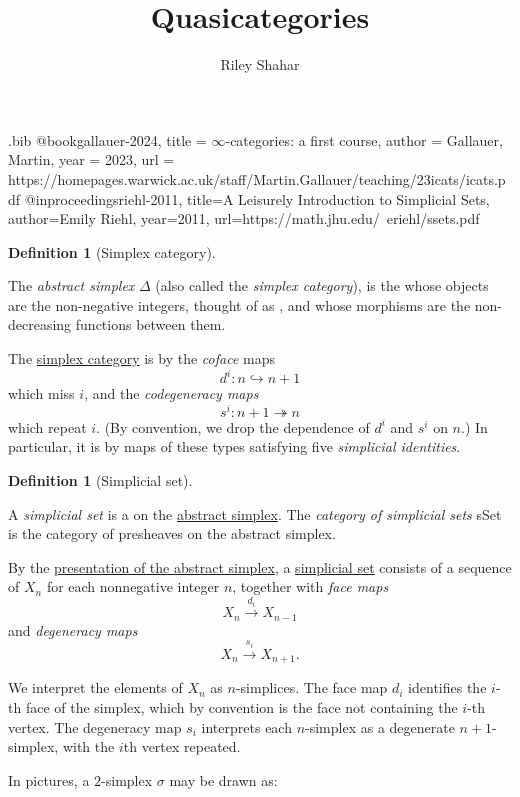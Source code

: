 \documentclass[oneside,a4paper]{book}%
\title{Quasicategories}\author{Riley Shahar}
\theoremstyle{definition}%
\newtheorem{definition}[theorem]{Definition}%
\begin{document}
\begin{filecontents*}[overwrite]{\jobname.bib}
@book{gallauer-2024,
  title = {$\infty$-categories: a first course},
  author = {Gallauer, Martin},
  year = {2023},
  url = {https://homepages.warwick.ac.uk/staff/Martin.Gallauer/teaching/23icats/icats.pdf}
}@inproceedings{riehl-2011,
  title={A Leisurely Introduction to Simplicial Sets},
  author={Emily Riehl},
  year={2011},
  url={https://math.jhu.edu/~eriehl/ssets.pdf}
}
\end{filecontents*}
\frontmatter\maketitle\tableofcontents\mainmatter\begin{Section}\label{rs-0083}\begin{definition}[{Simplex category}]\label{rs-007Z}\par{}The \emph{abstract simplex} \(\Delta \) (also called the \emph{simplex category}),
is the  whose objects are the non-negative integers, thought
of as  , and whose morphisms are the
non-decreasing functions between them.\end{definition}\begin{Proposition}\label{rs-0082}\par{}The \hyperref[rs-007Z]{simplex category} is  by the \emph{coface} maps
\[d^i: n\hookrightarrow  n+1\] which miss \(i\), and the \emph{codegeneracy maps} \[s^i: n+1\twoheadrightarrow  n\] which repeat \(i\). (By convention, we drop the dependence of \(d^i\)
and \(s^i\) on \(n\).) In particular, it is  by maps of these
types satisfying five \emph{simplicial identities}.\end{Proposition}\begin{definition}[{Simplicial set}]\label{rs-0080}\par{}A \emph{simplicial set} is a  on the \hyperref[rs-007Z]{abstract
simplex}. The \emph{category of simplicial sets} sSet is the
category of presheaves on the abstract simplex.\end{definition}\begin{Explanation}\label{rs-0081}\par{}By the \hyperref[rs-0082]{presentation of the abstract simplex}, a \hyperref[rs-0080]{simplicial
set} consists of a sequence of  \(X_n\) for each
nonnegative integer \(n\), together with \emph{face maps} \[X_n\xrightarrow {d_i} X_{n-1}\]
and \emph{degeneracy maps} \[X_n\xrightarrow {s_i} X_{n+1}.\]\par{}We interpret the elements of \(X_n\) as \(n\)-simplices. The face map
\(d_i\) identifies the \(i\)-th face of the simplex, which by convention is the
face not containing the \(i\)-th vertex. The degeneracy map \(s_i\) interprets
each \(n\)-simplex as a degenerate \(n+1\)-simplex, with the \(i\)th vertex
repeated.\par{}In pictures, a \(2\)-simplex \(\sigma \) may be drawn as:


\end{Explanation}
\end{Section}
\end{document}
